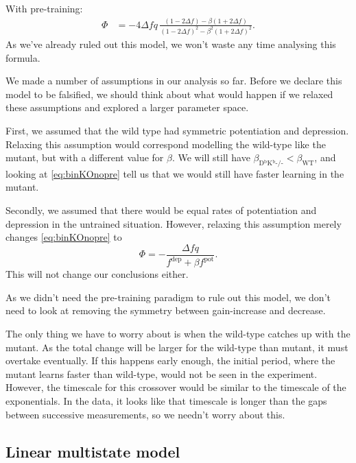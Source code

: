 \documentclass[12pt]{article}
\newcommand{\pot}{^{\text{pot}}}
\newcommand{\dep}{^{\text{dep}}}
\newcommand{\wt}{_{\text{WT}}}
\newcommand{\ko}{_{\text{D$^\mathrm{b}$K$^\mathrm{b}$-/-}}}
\begin{document}
With pre-training:
%
\begin{equation}\label{eq:binKOpre}
\begin{aligned}
  \Phi &= -4\Delta f q \, \frac{(1-2\Delta f) - \beta(1+2\Delta f)}
          {(1-2\Delta f)^2 - \beta^2(1+2\Delta f)^2}.
\end{aligned}
\end{equation}
%
As we've already ruled out this model, we won't waste any time analysing this formula.

We made a number of assumptions in our analysis so far.
Before we declare this model to be falsified, we should think about what would happen if we relaxed these assumptions and explored a larger parameter space.

First, we assumed that the wild type had symmetric potentiation and depression.
Relaxing this assumption would correspond modelling the wild-type like the mutant, but with a different value for $\beta$.
We will still have $\beta\ko<\beta\wt$, and looking at \eqref{eq:binKOnopre} tell us that we would still have faster learning in the mutant.

Secondly, we assumed that there would be equal rates of potentiation and depression in the untrained situation.
However, relaxing this assumption merely changes \eqref{eq:binKOnopre} to
%
\begin{equation}\label{eq:binKOnoprediff}
  \Phi = -\frac{\Delta f q}{f\dep+\beta f\pot}.
\end{equation}
%
This will not change our conclusions either.

As we didn't need the pre-training paradigm to rule out this model, we don't need to look at removing the symmetry between gain-increase and decrease.

The only thing we have to worry about is when the wild-type catches up with the mutant.
As the total change will be larger for the wild-type than mutant, it must overtake eventually.
If this happens early enough, the initial period, where the mutant learns faster than wild-type, would not be seen in the experiment.
However, the timescale for this crossover would be similar to the timescale of the exponentials.
In the data, it looks like that timescale is longer than the gaps between successive measurements, so we needn't worry about this.



\subsection{Linear multistate model}\label{sec:multistate_lin}
\end{document}
